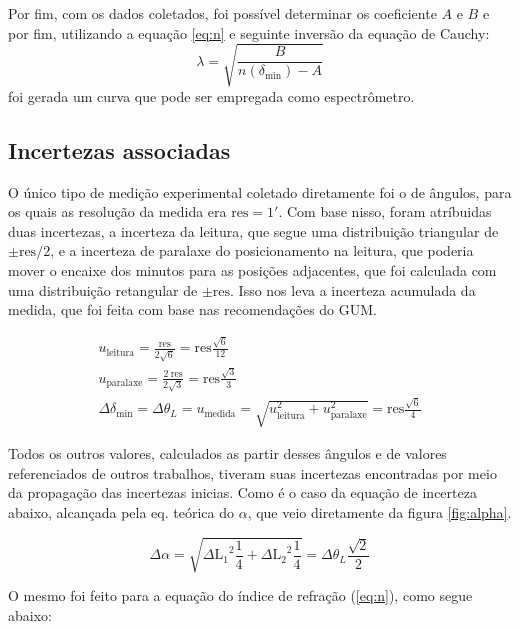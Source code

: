 Por fim, com os dados coletados, foi possível determinar os coeficiente $A$ e $B$ e por fim, utilizando a equação \ref{eq:n} e seguinte inversão da equação de Cauchy:
\begin{equation}
    \lambda = \sqrt{\frac{B}{n\left(\delta_\text{min}\right)-A}}
    \label{eq:lambda}
\end{equation}
foi gerada um curva que pode ser empregada como espectrômetro.


\subsection{Incertezas associadas}

O único tipo de medição experimental coletado diretamente foi o de ângulos, para os quais as resolução da medida era $\text{res}=\ang{;1;}$. Com base nisso, foram atríbuidas duas incertezas, a incerteza da leitura, que segue uma distribuição triangular de $\pm\text{res}/2$, e a incerteza de paralaxe do posicionamento na leitura, que poderia mover o encaixe dos minutos para as posições adjacentes, que foi calculada com uma distribuição retangular de $\pm\text{res}$. Isso nos leva a incerteza acumulada da medida, que foi feita com base nas recomendações do GUM\cite{ref:gum}.

\begin{gather*}
    u_{\text{leitura}} = \frac{\text{res}}{2 \sqrt{6}} = \text{res} \frac{\sqrt{6}}{12} \\
    u_{\text{paralaxe}} = \frac{2\ \text{res}}{2 \sqrt{3}} = \text{res} \frac{\sqrt{3}}{3} \\
    \Delta{\delta_{\text{min}}} = \Delta\theta_L = u_{\text{medida}}
        = \sqrt{u_{\text{leitura}}^2 + u_{\text{paralaxe}}^2}
        = \text{res} \frac{\sqrt{6}}{4}
\end{gather*}

Todos os outros valores, calculados as partir desses ângulos e de valores referenciados de outros trabalhos, tiveram suas incertezas encontradas por meio da propagação das incertezas inicias. Como é o caso da equação de incerteza abaixo, alcançada pela eq. teórica do $\alpha$, que veio diretamente da figura \ref{fig:alpha}.

\begin{equation*}
    \Delta{\alpha} = \sqrt{{\Delta{\text{L}_1}}^2\frac{1}{4} + {\Delta{\text{L}_2}}^2\frac{1}{4}} = \Delta\theta_L \frac{\sqrt{2}}{2}
\end{equation*}

O mesmo foi feito para a equação do índice de refração (\ref{eq:n}), como segue abaixo:

